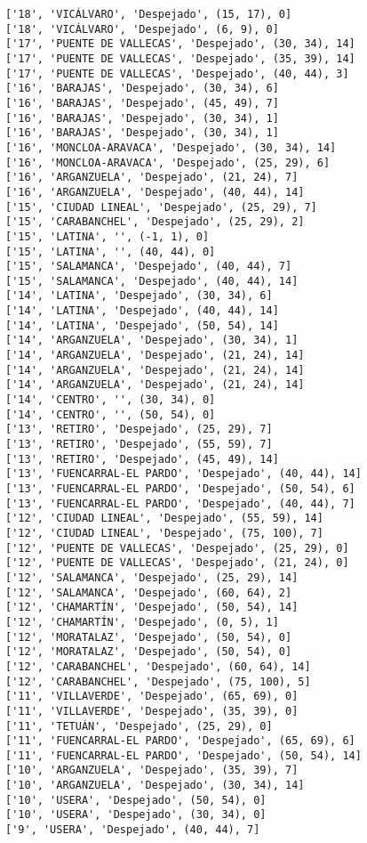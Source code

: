 \documentclass[11pt]{article}
\begin{document}
\begin{Verbatim}[commandchars=\\\{\}]
['18', 'VICÁLVARO', 'Despejado', (15, 17), 0]
['18', 'VICÁLVARO', 'Despejado', (6, 9), 0]
['17', 'PUENTE DE VALLECAS', 'Despejado', (30, 34), 14]
['17', 'PUENTE DE VALLECAS', 'Despejado', (35, 39), 14]
['17', 'PUENTE DE VALLECAS', 'Despejado', (40, 44), 3]
['16', 'BARAJAS', 'Despejado', (30, 34), 6]
['16', 'BARAJAS', 'Despejado', (45, 49), 7]
['16', 'BARAJAS', 'Despejado', (30, 34), 1]
['16', 'BARAJAS', 'Despejado', (30, 34), 1]
['16', 'MONCLOA-ARAVACA', 'Despejado', (30, 34), 14]
['16', 'MONCLOA-ARAVACA', 'Despejado', (25, 29), 6]
['16', 'ARGANZUELA', 'Despejado', (21, 24), 7]
['16', 'ARGANZUELA', 'Despejado', (40, 44), 14]
['15', 'CIUDAD LINEAL', 'Despejado', (25, 29), 7]
['15', 'CARABANCHEL', 'Despejado', (25, 29), 2]
['15', 'LATINA', '', (-1, 1), 0]
['15', 'LATINA', '', (40, 44), 0]
['15', 'SALAMANCA', 'Despejado', (40, 44), 7]
['15', 'SALAMANCA', 'Despejado', (40, 44), 14]
['14', 'LATINA', 'Despejado', (30, 34), 6]
['14', 'LATINA', 'Despejado', (40, 44), 14]
['14', 'LATINA', 'Despejado', (50, 54), 14]
['14', 'ARGANZUELA', 'Despejado', (30, 34), 1]
['14', 'ARGANZUELA', 'Despejado', (21, 24), 14]
['14', 'ARGANZUELA', 'Despejado', (21, 24), 14]
['14', 'ARGANZUELA', 'Despejado', (21, 24), 14]
['14', 'CENTRO', '', (30, 34), 0]
['14', 'CENTRO', '', (50, 54), 0]
['13', 'RETIRO', 'Despejado', (25, 29), 7]
['13', 'RETIRO', 'Despejado', (55, 59), 7]
['13', 'RETIRO', 'Despejado', (45, 49), 14]
['13', 'FUENCARRAL-EL PARDO', 'Despejado', (40, 44), 14]
['13', 'FUENCARRAL-EL PARDO', 'Despejado', (50, 54), 6]
['13', 'FUENCARRAL-EL PARDO', 'Despejado', (40, 44), 7]
['12', 'CIUDAD LINEAL', 'Despejado', (55, 59), 14]
['12', 'CIUDAD LINEAL', 'Despejado', (75, 100), 7]
['12', 'PUENTE DE VALLECAS', 'Despejado', (25, 29), 0]
['12', 'PUENTE DE VALLECAS', 'Despejado', (21, 24), 0]
['12', 'SALAMANCA', 'Despejado', (25, 29), 14]
['12', 'SALAMANCA', 'Despejado', (60, 64), 2]
['12', 'CHAMARTÍN', 'Despejado', (50, 54), 14]
['12', 'CHAMARTÍN', 'Despejado', (0, 5), 1]
['12', 'MORATALAZ', 'Despejado', (50, 54), 0]
['12', 'MORATALAZ', 'Despejado', (50, 54), 0]
['12', 'CARABANCHEL', 'Despejado', (60, 64), 14]
['12', 'CARABANCHEL', 'Despejado', (75, 100), 5]
['11', 'VILLAVERDE', 'Despejado', (65, 69), 0]
['11', 'VILLAVERDE', 'Despejado', (35, 39), 0]
['11', 'TETUÁN', 'Despejado', (25, 29), 0]
['11', 'FUENCARRAL-EL PARDO', 'Despejado', (65, 69), 6]
['11', 'FUENCARRAL-EL PARDO', 'Despejado', (50, 54), 14]
['10', 'ARGANZUELA', 'Despejado', (35, 39), 7]
['10', 'ARGANZUELA', 'Despejado', (30, 34), 14]
['10', 'USERA', 'Despejado', (50, 54), 0]
['10', 'USERA', 'Despejado', (30, 34), 0]
['9', 'USERA', 'Despejado', (40, 44), 7]

\end{Verbatim}
\end{document}
